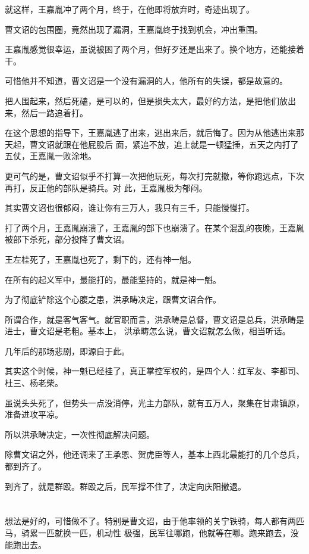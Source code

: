 \documentclass[11pt,a4paper,onecolumn]{article}
\begin{document}
就这样，王嘉胤冲了两个月，终于，在他即将放弃时，奇迹出现了。

曹文诏的包围圈，竟然出现了漏洞，王嘉胤终于找到机会，冲出重围。

王嘉胤感觉很幸运，虽说被困了两个月，但好歹还是出来了。换个地方，还能接着干。

可惜他并不知道，曹文诏是一个没有漏洞的人，他所有的失误，都是故意的。

把人围起来，然后死磕，是可以的，但是损失太大，最好的方法，是把他们放出来，然后一路追着打。

在这个思想的指导下，王嘉胤逃了出来，逃出来后，就后悔了。因为从他逃出来那天起，曹文诏就跟在他屁股后
面，紧追不放，追上就是一顿猛捶，五天之内打了五仗，王嘉胤一败涂地。

更可气的是，曹文诏似乎不打算一次把他玩死，每次打完就撤，等你跑远点，下次再打，反正他的部队是骑兵。对
此，王嘉胤极为郁闷。

其实曹文诏也很郁闷，谁让你有三万人，我只有三千，只能慢慢打。

打了两个月，王嘉胤崩溃了，王嘉胤的部下也崩溃了。在某个混乱的夜晚，王嘉胤被部下杀死，部分投降了曹文诏。

王左桂死了，王嘉胤也死了，剩下的，还有神一魁。

在所有的起义军中，最能打的，最能坚持的，就是神一魁。

为了彻底铲除这个心腹之患，洪承畴决定，跟曹文诏合作。

所谓合作，就是客气客气。就官职而言，洪承畴是总督，曹文诏是总兵，洪承畴是进士，曹文诏是老粗。基本上，
洪承畴怎么说，曹文诏就怎么做，相当听话。

几年后的那场悲剧，即源自于此。

其实这个时候，神一魁已经挂了，真正掌控军权的，是四个人：红军友、李都司、杜三、杨老柴。

虽说头头死了，但势头一点没消停，光主力部队，就有五万人，聚集在甘肃镇原，准备进攻平凉。

所以洪承畴决定，一次性彻底解决问题。

除曹文诏之外，他还调来了王承恩、贺虎臣等人，基本上西北最能打的几个总兵，都到齐了。

到齐了，就是群殴。群殴之后，民军撑不住了，决定向庆阳撤退。

\section[\thesection]{}

想法是好的，可惜做不了。特别是曹文诏，由于他率领的关宁铁骑，每人都有两匹马，骑累一匹就换一匹，机动性
极强，民军往哪跑，他就等在哪。跑来跑去，没能跑出去。
\end{document}

